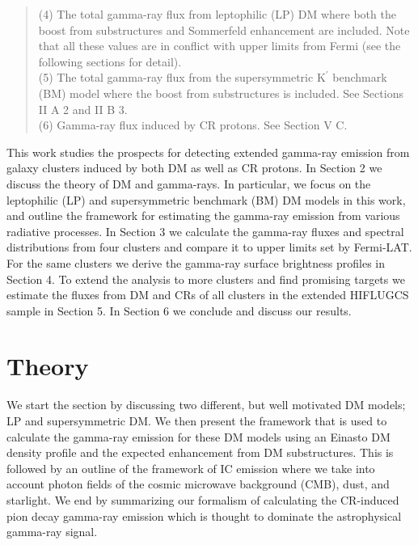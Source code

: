 \documentclass[10pt,aps,pra,reprint,amsmath,amsfonts,amssymb,showpacs,nofootinbib,floatfix]{revtex4-1}
\newcommand{\rmn}{\mathrm}
\newcommand{\Kp}{\rmn{K}^\prime}
\begin{document}
\begin{table}
\begin{minipage}{2.0\columnwidth}
\begin{quote}
  (4) The total gamma-ray flux from leptophilic (LP) DM where both the
  boost from substructures and Sommerfeld enhancement are
  included. Note that all these values are in conflict with upper limits from
  Fermi (see the following sections for detail).\\
  (5) The total gamma-ray flux from the supersymmetric $\Kp$ benchmark (BM) 
  model where the boost from substructures is included. See Sections II A 2 and II B 3.\\
  (6) Gamma-ray flux induced by CR protons. See Section V C. 
 \label{tab:flux_tab}
  \end{quote}
\end{minipage}
\end{table} 

This work studies the prospects for detecting extended gamma-ray
emission from galaxy clusters induced by both DM as well as CR
protons. In Section 2 we discuss the theory of DM and gamma-rays. In
particular, we focus on the leptophilic (LP) and supersymmetric
benchmark (BM) DM models in this work, and outline the framework
for estimating the gamma-ray emission from various radiative
processes. In Section 3 we calculate the gamma-ray fluxes and spectral
distributions from four clusters and compare it to upper limits set by
Fermi-LAT. For the same clusters we derive the gamma-ray surface
brightness profiles in Section 4. To extend the analysis to more
clusters and find promising targets we estimate the fluxes from DM and
CRs of all clusters in the extended HIFLUGCS sample in Section 5. In
Section 6 we conclude and discuss our results.

\section{Theory}
\label{sect:theory}
We start the section by discussing two different, but well motivated
DM models; LP and supersymmetric DM. We then present the framework
that is used to calculate the gamma-ray emission for these DM models
using an Einasto DM density profile and the expected enhancement from
DM substructures. This is followed by an outline of the framework of
IC emission where we take into account photon fields of the cosmic
microwave background (CMB), dust, and starlight. We end by summarizing
our formalism of calculating the CR-induced pion decay gamma-ray
emission which is thought to dominate the astrophysical gamma-ray
signal.
\end{document}
